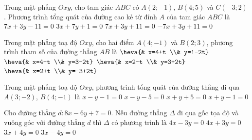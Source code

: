 \begin{ex}%
	Trong mặt phẳng $Oxy$, cho tam giác $ABC$ có  $A(2;-1)$, $B(4;5)$ và $C(-3;2)$. Phương trình tổng quát của đường cao kẻ từ đỉnh $A$ của tam giác $ABC$ là
	\choice 
		{\True  $7x+3y-11=0$}
		 {$3x+7y+1=0$}
		{$7x+3y+11=0$} 
		 {$-7x+3y+11=0$}
\end{ex}

\begin{ex}%
	Trong mặt phẳng toạ độ $Oxy$,  cho hai điểm $A\left( 4;-1 \right)$ và $B\left(2;3 \right)$, phương trình tham số của đường thẳng $AB$ là
	\choice 
		{$\heva{&  x=4+t \\& y=1-2t}$}
		{$\heva{& x=4+t  \\& y=3-2t}$}
		{\True $\heva{& x=2-t \\& y=3+2t}$} 
		{$\heva{& x=2+t \\&  y=-3+2t}$}
\end{ex}

\begin{ex}%
	Trong mặt phẳng toạ độ $Oxy$, phương trình tổng quát  của đường thẳng đi qua $A(3;-2)$, $B(4;-1)$ là
	\choice 
		 {$x-y-1=0$}
		 {$x-y-5=0$}
		{$x+y+5=0$} 
		{\True $x+y-1=0$} 
\end{ex}

\begin{ex}%
	Cho đường thẳng $d\colon 8x-6y+7=0$. Nếu đường thẳng $\Delta$ đi qua gốc tọa độ  và vuông góc với đường thẳng $d$ thì $\Delta$ có phương trình là
	\choice 
		{$4x-3y=0$} 
		{$4x+3y=0$} 
		{\True $3x+4y=0$} 
		 {$3x-4y=0$}
\end{ex}


